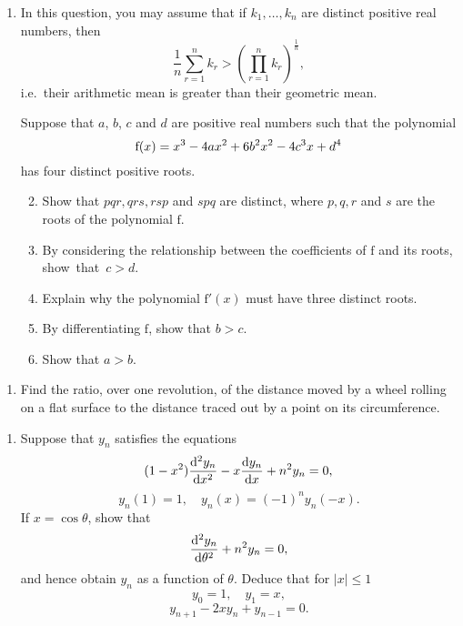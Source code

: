 \documentclass[a4, 11pt]{report}
\newlength{\qspace}
\newcounter{qnumber}
\newenvironment{question}%
 {\vspace{\qspace}
  \begin{enumerate}[\bfseries 1\quad][10]%
    \setcounter{enumi}{\value{qnumber}}%
    \item%
 }
{
  \end{enumerate}
  \filbreak
  \stepcounter{qnumber}
 }
\newenvironment{questionparts}[1][1]%
 {
  \begin{enumerate}[\bfseries (i)]%
    \setcounter{enumii}{#1}
    \addtocounter{enumii}{-1}
    \setlength{\itemsep}{5mm}
    \setlength{\parskip}{8pt}
 }
 {
  \end{enumerate}
 }
\begin{document}
\begin{question}
In this question,
you may assume that if $k_1,\dots,k_n$ are distinct positive real
numbers, then
\[\frac1n\sum_{r=1}^nk_r>\left({\prod\limits_{r=1}^n}
k_r\right )^{\!\! \frac1n},\]
i.e.\ their arithmetic mean is greater than their geometric mean.

Suppose that $a$, $b$, $c$ and $d$ are positive real numbers such
that the polynomial
\[{\rm f}(x)=x^3-4ax^2+6b^2x^2-4c^3x+d^4\]
has four distinct positive roots.

\begin{questionparts}
\item Show that $pqr,qrs,rsp$ and $spq$ are distinct, where $p,q,r$ and $s$ are the roots of the polynomial $\mathrm{f}$.
\item By considering the relationship between the coefficients of $\mathrm{f}$ and
its roots, \mbox{show that $c>d$.}
\item Explain why the polynomial $\mathrm{f}'(x)$ must have three distinct roots. 
\item By differentiating $\mathrm{f}$, show that $b>c$.

\item  Show that $a>b$.
\end{questionparts}
	\end{question}

\begin{question}
Find the ratio, over one revolution, of the distance moved by a
wheel rolling on a flat surface to the distance traced out by a point
on its circumference.
	\end{question}
	
\begin{question}
 Suppose that $y_n$ satisfies the equations
\[(1-x^2)\frac{{\rm d}^2y_n}{{\rm d}x^2}-x\frac{{\rm
d}y_n}{{\rm d}x}+n^2y_n=0,\]
\[y_n(1)=1,\quad y_n(x)=(-1)^ny_n(-x).\]
If 
$x=\cos\theta$, show that
\[\frac{{\rm d}^2y_n}{{\rm d}\theta^2}+n^2y_n=0,\] and hence
obtain
$y_n$ as a function of
$\theta$. Deduce that for $|x|\leqslant1$
\[y_0=1,\quad y_1=x,\]
\[y_{n+1}-2xy_n+y_{n-1}=0.\]
\end{question}
	
\end{document}
